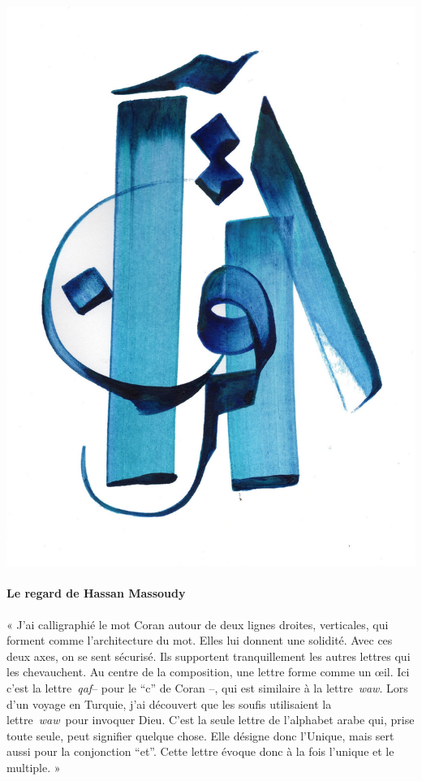 \includegraphics[width=\textwidth]{Images/image017.jpg}


\paragraph{Le regard de Hassan Massoudy}
\begin{cite}
« J'ai calligraphié le mot Coran autour de deux lignes droites,
verticales, qui forment comme l'architecture du mot. Elles lui donnent
une solidité. Avec ces deux axes, on se sent sécurisé. Ils supportent
tranquillement les autres lettres qui les chevauchent. Au centre de la
composition, une lettre forme comme un œil. Ici c'est la
lettre~\emph{qaf}-- pour le ``c'' de Coran --, qui est similaire à la
lettre~\emph{waw}. Lors d'un voyage en Turquie, j'ai découvert que les
soufis utilisaient la lettre~\emph{waw}~pour invoquer Dieu. C'est la
seule lettre de l'alphabet arabe qui, prise toute seule, peut signifier
quelque chose. Elle désigne donc l'Unique, mais sert aussi pour la
conjonction ``et''. Cette lettre évoque donc à la fois l'unique et le
multiple. »
\end{cite}


